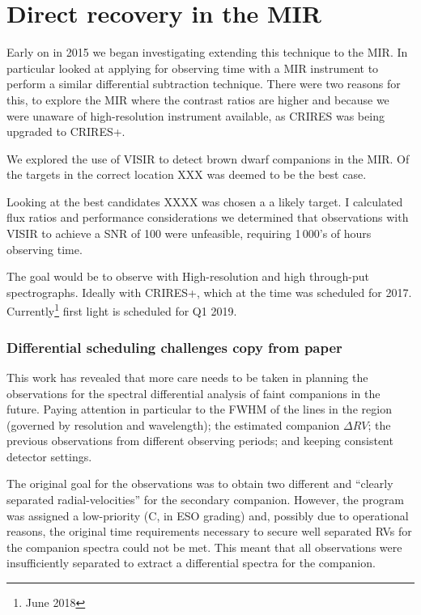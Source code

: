 \section{Direct recovery in the {MIR}}
Early on in 2015 we began investigating extending this technique to the {MIR}. In particular looked at applying for observing time with a {MIR} instrument to perform a similar differential subtraction technique.
There were two reasons for this, to explore the {MIR} where the contrast ratios are higher and because we were unaware of high-resolution \nir{} instrument available, as {CRIRES} was being upgraded to {CRIRES+}.

We explored the use of VISIR to detect brown dwarf companions in the {MIR}. Of the targets in the correct location XXX was deemed to be the best case.

Looking at the best candidates XXXX was chosen a a likely target. I calculated flux ratios and performance considerations we determined that observations with VISIR to achieve a {SNR} of 100 were unfeasible, requiring 1\,000's of hours observing time.

The goal would be to observe with High-resolution and high through-put spectrographs. Ideally with {CRIRES+}, which at the time was scheduled for 2017. Currently\footnote{June 2018} first light is scheduled for Q1 2019.




\subsubsection{Differential scheduling challenges {copy from paper}}
\label{subsubsec:differential-schedualing}
This work has revealed that more care needs to be taken in planning the observations for the spectral differential analysis of faint companions in the future. Paying attention in particular to the {FWHM} of the lines in the region (governed by resolution and wavelength); the estimated companion \(\Delta {RV}\); the previous observations from different observing periods; and keeping consistent detector settings.

The original goal for the observations was to obtain two different and ``clearly separated radial-velocities'' for the secondary companion. However, the program was assigned a low-priority (C, in ESO grading) and, possibly due to operational reasons, the original time requirements necessary to secure well separated RVs for the companion spectra could not be met. This meant that all observations were insufficiently separated to extract a differential spectra for the companion.

